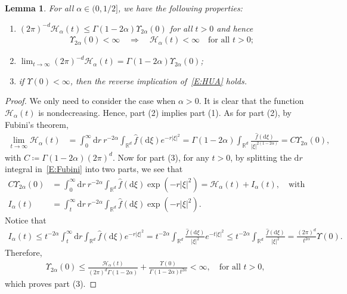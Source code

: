 \documentclass[a4paper,11pt]{article}%
\theoremstyle{plain}
\newtheorem{lemma}[theorem]{Lemma}
\theoremstyle{definition}
\numberwithin{equation}{section}
\newcommand{\R}{\mathbb{R}}
\newcommand{\ud}{\ensuremath{\mathrm{d}}}
\begin{document}
\begin{lemma}\label{L:HUA}
  For all $\alpha\in (0,1/2]$, we have the following properties:
  \begin{enumerate}[(1)]
  \item $\left(2\pi\right)^{-d}\mathcal{H}_\alpha(t)\le
    \Gamma\left(1-2\alpha\right)\Upsilon_{2\alpha}(0)$ for all $t>0$ and hence
    \begin{align}\label{E:HUA}
      \Upsilon_{2\alpha}(0)<\infty \quad \Longrightarrow \quad \mathcal{H}_\alpha(t)<\infty \quad \text{for
      all $t>0$};
    \end{align}
  \item $\lim_{t\to\infty}\left(2\pi\right)^{-d}\mathcal{H}_\alpha(t)= \Gamma\left(1-2\alpha\right)
    \Upsilon_{2\alpha}(0)$;
  \item if $\Upsilon(0)<\infty$, then the reverse implication of~\eqref{E:HUA} holds.
\end{enumerate}
\end{lemma}
\begin{proof}
  We only need to consider the case when $\alpha>0$. It is clear that the function
  $\mathcal{H}_\alpha(t)$ is nondecreasing. Hence, part (2) implies part (1). As for part (2), by
  Fubini's theorem,
  \begin{align}\label{E:Fubini}
    \lim_{t\to\infty}\mathcal{H}_\alpha(t)
    & = \int_0^\infty \ud r \: r^{-2\alpha} \int_{\R^d} \widehat{f}(\ud\xi)e^{-r|\xi|^2}
      = \Gamma(1-2\alpha) \int_{\R^d} \frac{\widehat{f}(\ud\xi)}{|\xi|^{2\left(1-2\alpha\right)}}
      = C \Upsilon_{2\alpha}(0),
  \end{align}
  with $C\coloneqq \Gamma(1-2\alpha)(2\pi)^d$. Now for part (3), for any $t>0$, by splitting the $\ud r$
  integral in~\eqref{E:Fubini} into two parts, we see that
  \begin{align*}
    C \Upsilon_{2\alpha}(0) & = \int_0^\infty \ud r \: r^{-2\alpha} \int_{\R^d} \widehat{f}(\ud\xi)\exp\left(-r|\xi|^2\right) = \mathcal{H}_\alpha(t) + I_\alpha(t), \quad \text{with} \\
    I_\alpha(t)             & = \int_t^\infty \ud r \: r^{-2\alpha} \int_{\R^d}
    \widehat{f}(\ud\xi)\exp\left(-r|\xi|^2\right).
  \end{align*}
  Notice that
  \begin{align*}
    I_\alpha(t) \le t^{-2\alpha} \int_t^\infty \ud r \int_{\R^d} \widehat{f}(\ud\xi)e^{-r|\xi|^2}
    = t^{-2\alpha} \int_{\R^d} \frac{\widehat{f}(\ud\xi)}{|\xi|^2} e^{-t|\xi|^2}
    \le t^{-2\alpha} \int_{\R^d} \frac{\widehat{f}(\ud\xi)}{|\xi|^2}
    = \frac{\left(2\pi\right)^d}{t^{2\alpha}} \Upsilon(0).
  \end{align*}
  Therefore,
  \begin{align*}
    \Upsilon_{2\alpha}(0) \le \frac{\mathcal{H}_\alpha(t)}{(2\pi)^d\Gamma(1-2\alpha)} +
    \frac{\Upsilon(0)}{\Gamma\left(1-2\alpha\right)t^{2\alpha}} <\infty, \quad \text{for all $t>0$,}
  \end{align*}
  which proves part (3).
\end{proof}
\end{document}
